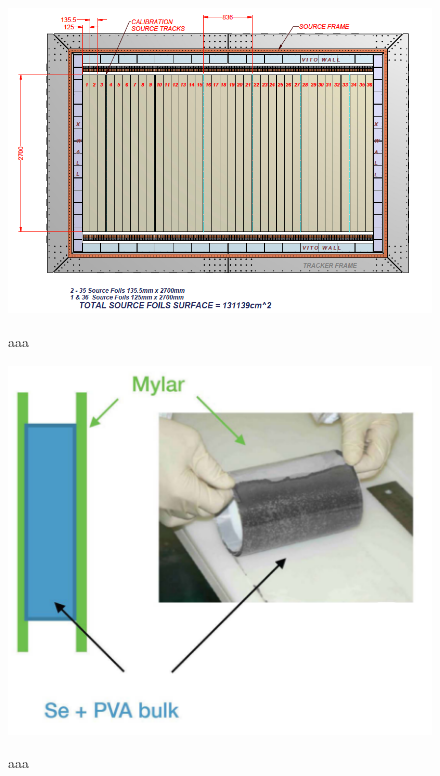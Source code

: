 \documentclass[main.tex]{subfiles}
\begin{document}
\begin{figure}[h!]
\centering
\includegraphics[scale=0.3]{pictures/Chap4/foil.png}
\label{foil.png}
\caption{aaa}
\end{figure}


\begin{figure}[h!]
\centering
\includegraphics[scale=0.3]{pictures/Chap4/MylarDesign.png}
\label{MylarDesign.png}
\caption{aaa}
\end{figure}
\end{document}
